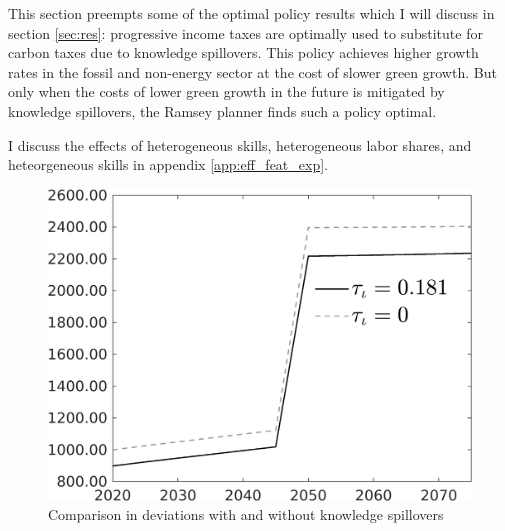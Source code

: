 This section preempts some of the optimal policy results which I will discuss in section \ref{sec:res}: progressive income taxes are optimally used to substitute for carbon taxes due to knowledge spillovers. This policy achieves higher growth rates in the fossil and non-energy sector at the cost of slower green growth.
 But only when the costs of lower green growth in the future is mitigated by knowledge spillovers, the Ramsey planner finds such a policy optimal. 

I discuss the effects of heterogeneous skills, heterogeneous labor shares, and heteorgeneous skills in appendix \ref{app:eff_feat_exp}. 
 \begin{figure}[h!!]
	\centering
	\caption{Comparison in deviations with and without knowledge spillovers}\label{fig:Limit_nsk0_xgr0_know_Devs}
		\begin{minipage}[]{0.32\textwidth}
		\includegraphics[width=1\textwidth]{../../codding_model/own_basedOnFried/optimalPol_010922_revision/figures/all_13Sept22/CompTauf_bytaul_Reg0_Tauf_spillover0_nsk0_xgr0_knspil1_sep0_LFlimit1_emsbase0_countec0_GovRev0_etaa0.79_lgd1.png}
	\end{minipage}	
\begin{minipage}[]{0.32\textwidth}

\end{minipage}
\end{figure}
